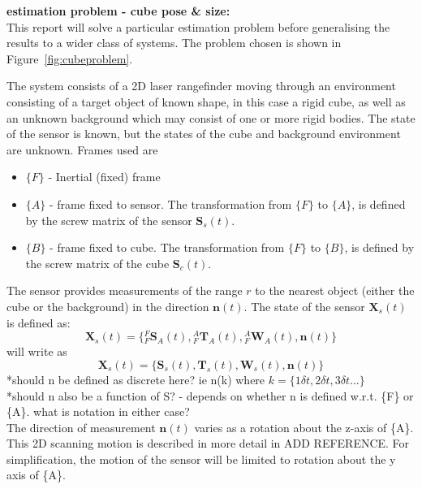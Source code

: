 \textbf{estimation problem - cube pose \& size:}\\
This report will solve a particular estimation problem before generalising the results to a wider class of systems. The problem chosen is shown in Figure~\ref{fig:cubeproblem}.

The system consists of a 2D laser rangefinder moving through an environment consisting of a target object of known shape, in this case a rigid cube, as well as an unknown background which may consist of one or more rigid bodies. The state of the sensor is known, but the states of the cube and background environment are unknown.
Frames used are
\begin{itemize}
\item $\{F\}$ - Inertial (fixed) frame
\item $\{A\}$ - frame fixed to sensor. The transformation from $\{F\}$ to $\{A\}$, is defined by the screw matrix of the sensor $\mathbf{S}_{s}(t)$.
\item $\{B\}$ - frame fixed to cube. The transformation from $\{F\}$ to $\{B\}$, is defined by the screw matrix of the cube $\mathbf{S}_{c}(t)$.
\end{itemize} 

The sensor provides measurements of the range $r$ to the nearest object (either the cube or the background) in the direction $\mathbf{n}(t)$. 
The state of the sensor $\mathbf{X}_{s}(t)$ is defined as:
\begin{equation}
	\mathbf{X}_{s}(t) = 
	\{{^{F}_{F}\mathbf{S}^{}_{A}(t)},{^{A}_{F}\mathbf{T}^{}_{A}(t)},{^{A}_{F}\mathbf{W}^{}_{A}(t)},
	\mathbf{n}(t)\}
\end{equation}
will write as 
\begin{equation}
	\mathbf{X}_{s}(t) = 
	\{\mathbf{S}_{s}(t),\mathbf{T}_{s}(t),\mathbf{W}_{s}(t),\mathbf{n}(t)\}
\end{equation}
*should n be defined as discrete here? ie n(k) where $k = \{1\delta t,2\delta t,3\delta t...\}$\\
*should n also be a function of S? - depends on whether n is defined w.r.t. \{F\} or \{A\}. what is notation in either case?\\
The direction of measurement $\mathbf{n}(t)$ varies as a rotation about the z-axis of \{A\}. This 2D scanning motion is described in more detail in ADD REFERENCE. For simplification, the motion of the sensor will be limited to rotation about the y axis of \{A\}.

